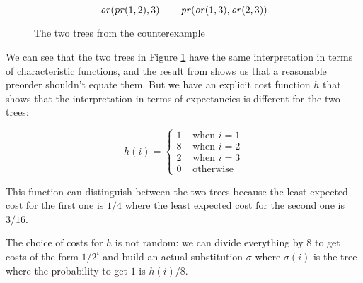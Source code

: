 \begin{figure}[h]

    \begin{center}
        \hspace{2em}
    \end{center}

    \begin{equation*}
        \operatorname{\mathit{or}} (\operatorname{\mathit{pr}} (1,2), 3) \quad \quad \operatorname{\mathit{pr}} (\operatorname{\mathit{or}} (1,3), \operatorname{\mathit{or}} (2,3))
    \end{equation*}
    \caption{The two trees from the counterexample}
    \label{fig:counterexampletree}
\end{figure}

We can see that the two trees in Figure \ref{fig:counterexampletree} 
have the same interpretation in terms of characteristic functions,
and the result from \cite{Mislove2000} shows us that a reasonable 
preorder shouldn't equate them. But we have an explicit 
cost function $h$ that shows that the interpretation in terms of 
expectancies is different for the two trees:

\begin{equation*}
    h (i) = \begin{cases}
        1 & \text{ when } i = 1 \\
        8 & \text{ when } i = 2 \\
        2 & \text{ when } i = 3 \\
        0 & \text{ otherwise } 
    \end{cases}
\end{equation*}

This function can distinguish between the two trees 
because the least expected cost for the first one is $1/4$
where the least expected cost for the second one is $3/16$.

The choice of costs for $h$ is not random: we can divide 
everything by $8$ to get costs of the form $1/2^i$ 
and build an actual substitution $\sigma$ where $\sigma(i)$ 
is the tree where the probability to get $1$ is $h(i)/8$.
